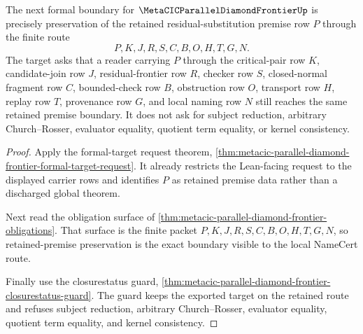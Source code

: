 \begin{theorem}
\label{thm:metacic-parallel-diamond-frontier-retained-premise-target-boundary}
The next formal boundary for $\MetaCICParallelDiamondFrontierUp$ is precisely preservation of the retained residual-substitution premise row $P$ through the finite route
$$
P,K,J,R,S,C,B,O,H,T,G,N .
$$
The target asks that a reader carrying $P$ through the critical-pair row $K$, candidate-join row $J$, residual-frontier row $R$, checker row $S$, closed-normal fragment row $C$, bounded-check row $B$, obstruction row $O$, transport row $H$, replay row $T$, provenance row $G$, and local naming row $N$ still reaches the same retained premise boundary. It does not ask for subject reduction, arbitrary Church--Rosser, evaluator equality, quotient term equality, or kernel consistency.
\end{theorem}
\begin{proof}
Apply the formal-target request theorem, \autoref{thm:metacic-parallel-diamond-frontier-formal-target-request}. It already restricts the Lean-facing request to the displayed carrier rows and identifies $P$ as retained premise data rather than a discharged global theorem.

Next read the obligation surface of \autoref{thm:metacic-parallel-diamond-frontier-obligations}. That surface is the finite packet $P,K,J,R,S,C,B,O,H,T,G,N$, so retained-premise preservation is the exact boundary visible to the local NameCert route.

Finally use the closurestatus guard, \autoref{thm:metacic-parallel-diamond-frontier-closurestatus-guard}. The guard keeps the exported target on the retained route and refuses subject reduction, arbitrary Church--Rosser, evaluator equality, quotient term equality, and kernel consistency.
\end{proof}


